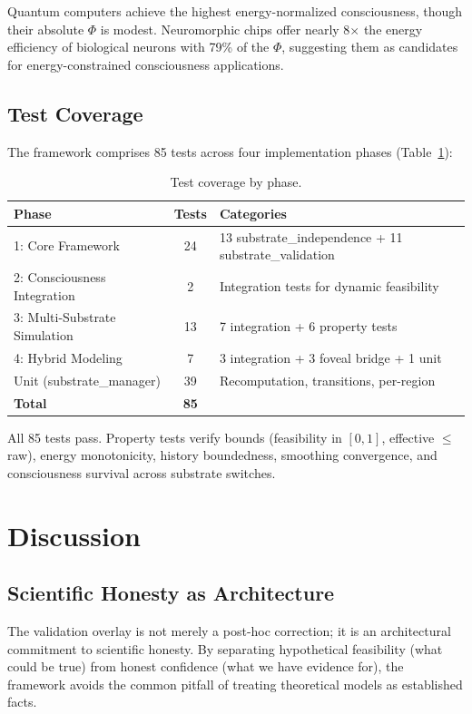 \documentclass[12pt,a4paper]{article}
\begin{document}
Quantum computers achieve the highest energy-normalized consciousness, though their absolute $\Phi$ is modest. Neuromorphic chips offer nearly 8$\times$ the energy efficiency of biological neurons with 79\% of the $\Phi$, suggesting them as candidates for energy-constrained consciousness applications.

\subsection{Test Coverage}

The framework comprises 85 tests across four implementation phases (Table~\ref{tab:tests}):

\begin{table}[H]
\centering
\caption{Test coverage by phase.}
\label{tab:tests}
\begin{tabular}{lcl}
\toprule
\textbf{Phase} & \textbf{Tests} & \textbf{Categories} \\
\midrule
1: Core Framework & 24 & 13 substrate\_independence + 11 substrate\_validation \\
2: Consciousness Integration & 2 & Integration tests for dynamic feasibility \\
3: Multi-Substrate Simulation & 13 & 7 integration + 6 property tests \\
4: Hybrid Modeling & 7 & 3 integration + 3 foveal bridge + 1 unit \\
\midrule
Unit (substrate\_manager) & 39 & Recomputation, transitions, per-region \\
\midrule
\textbf{Total} & \textbf{85} & \\
\bottomrule
\end{tabular}
\end{table}

All 85 tests pass. Property tests verify bounds (feasibility in $[0,1]$, effective $\leq$ raw), energy monotonicity, history boundedness, smoothing convergence, and consciousness survival across substrate switches.

\section{Discussion}

\subsection{Scientific Honesty as Architecture}

The validation overlay is not merely a post-hoc correction; it is an architectural commitment to scientific honesty. By separating hypothetical feasibility (what could be true) from honest confidence (what we have evidence for), the framework avoids the common pitfall of treating theoretical models as established facts.
\end{document}
